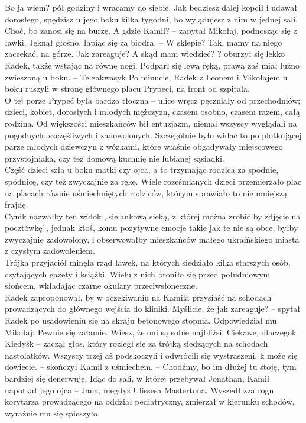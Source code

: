 \documentclass[../MAIN.tex]{subfiles}
\begin{document}
\xx Bo ja wiem? pół godziny i wracamy do siebie.
\xx Jak będziesz dalej kopcił i udawał dorosłego, spędzisz u jego boku kilka tygodni, bo wylądujesz z nim w jednej sali. Choć, bo zanosi się na burzę.
\xx A gdzie Kamil? -- zapytał Mikołaj, podnosząc się z ławki. Jęknął głośno, łapiąc się za biodra. -- W sklepie?
\xx Tak, mamy na niego zaczekać, na górze.
\xx Jak zareaguje?
\xx A skąd mam wiedzieć? ? oburzył się lekko Radek, także wstając na równe nogi. Podparł się lewą ręką, prawą zaś miał luźno zwieszoną u boku. -- Te zakwasy\3k
\qd
Po minucie, Radek z Leonem i Mikołajem u boku ruszyli w stronę głównego placu Prypeci, na front od szpitala.\\
O tej porze Prypeć była bardzo tłoczna -- ulice wręcz pęczniały od przechodniów; dzieci, kobiet, dorosłych i młodych mężczyzn, czasem osobno, czasem razem, całą rodziną. Od większości mieszkańców bił entuzjazm, niemal wszyscy wyglądali na pogodnych, szczęśliwych i zadowolonych. Szczególnie było widać to po plotkującej parze młodych dziewczyn z wózkami, które właśnie obgadywały miejscowego przystojniaka, czy też domową kuchnię nie lubianej sąsiadki.\\
Część dzieci szła u boku matki czy ojca, a to trzymając rodzica za spodnie, spódnicę, czy też zwyczajnie za rękę. Wiele roześmianych dzieci przemierzało plac na placach równie uśmiechniętych rodziców, którym sprawiało to nie mniejszą frajdę.\\
Cynik nazwałby ten widok ,,sielankową sieką, z której można zrobić by zdjęcie na pocztówkę'', jednak ktoś, komu pozytywne emocje takie jak te nie są obce, byłby zwyczajnie zadowolony, i obserwowałby mieszkańców małego ukraińskiego miasta z czystym zadowoleniem.\\
Trójka przyjaciół minęła rząd ławek, na których siedziało kilka starszych osób, czytających gazety i książki. Wielu z nich broniło się przed południowym słońcem, wkładając czarne okulary przeciwsłoneczne.\\
Radek zaproponował, by w oczekiwaniu na Kamila przysiąść na schodach prowadzących do głównego wejścia do kliniki.
\sx Myślicie, że jak zareaguje? -- spytał Radek po usadowieniu się na skraju betonowego stopnia. Odpowiedział mu Mikołaj:
\xx Pewnie się załamie. Wiesz, że oni są sobie najbliżsi.
\xx Ciekawe, dlaczego\3k
\xx Kiedyś\3k -- zaczął głos, który rozległ się za trójką siedzących na schodach nastolatków. Wszyscy trzej aż podskoczyli i odwrócili się wystraszeni.
\xx \3k może się dowiecie. -- skończył Kamil z uśmiechem. -- Chodźmy, bo im dłużej tu stoję, tym bardziej się denerwuję.
\qd
% 
% 
% 
Idąc do sali, w której przebywał Jonathan, Kamil napotkał jego ojca -- Jana, niegdyś Ulissesa Mastertona. Wyszedł zza rogu korytarza prowadzącego na oddział pediatryczny, zmierzał w kierunku schodów, wyraźnie mu się spieszyło.
\end{document}
